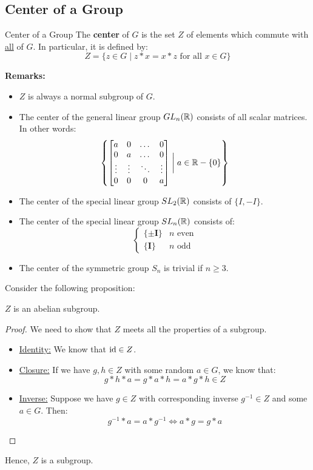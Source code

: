 \documentclass[letterpaper]{article}
\begin{document}
\subsection{Center of a Group}
\begin{definition}{Center of a Group}{}
    The \textbf{center} of $G$ is the set $Z$ of elements which commute with \underline{all} of $G$. In particular, it is defined by: 
    \[Z = \{z \in G \mid z * x = x * z \text{ for all } x \in G\}\]
\end{definition}
\textbf{Remarks:}
\begin{itemize}
    \item $Z$ is always a normal subgroup of $G$. 
    \item The center of the general linear group $GL_{n}(\mathbb{R})$ consists of all scalar matrices. In other words:
    \[\left\{\begin{bmatrix}
        a & 0 & \dots & 0 \\ 
        0 & a & \dots & 0 \\ 
        \vdots & \vdots & \ddots & \vdots \\ 
        0 & 0 & 0 & a 
    \end{bmatrix} \mathrel{\bigg|} a \in \mathbb{R} - \{0\}\right\}\]
    \item The center of the special linear group $SL_{2}(\mathbb{R})$ consists of $\{I, -I\}$. 
    \item The center of the special linear group $SL_{n}(\mathbb{R})$ consists of: 
    \[
        \begin{cases}
            \{\pm \mathbf{I}\} & n \text{ even} \\ 
            \{\mathbf{I}\} & n \text{ odd}
        \end{cases}    
    \]
    \item The center of the symmetric group $S_n$ is trivial if $n \geq 3$.
\end{itemize}

Consider the following proposition: 
\begin{mdframed}
    \begin{proposition}
        $Z$ is an abelian subgroup. 
    \end{proposition}
\end{mdframed}
\begin{mdframed}
    \begin{proof}
        We need to show that $Z$ meets all the properties of a subgroup. 
        \begin{itemize}
            \item \underline{Identity:} We know that $\operatorname{id} \in Z$. 
            \item \underline{Closure:} If we have $g, h \in Z$ with some random $a \in G$, we know that: 
            \[g * h * a = g * a * h = a * g * h \in Z\]
            \item \underline{Inverse:} Suppose we have $g \in Z$ with corresponding inverse $g^{-1} \in Z$ and some $a \in G$. Then: 
            \[g^{-1} * a = a * g^{-1} \iff a * g = g * a\]
        \end{itemize}
    \end{proof}
    Hence, $Z$ is a subgroup. 
\end{mdframed}
\end{document}
